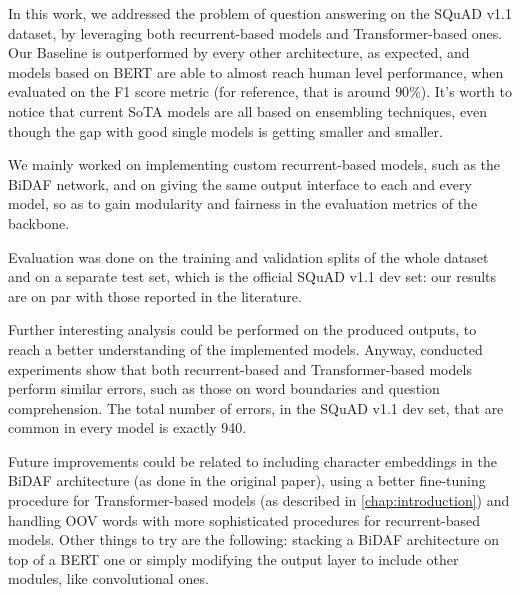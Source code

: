\documentclass[a4paper,10pt]{report}
\begin{document}
In this work, we addressed the problem of question answering on the SQuAD v1.1 dataset, by leveraging both recurrent-based models and Transformer-based ones. Our Baseline is outperformed by every other architecture, as expected, and models based on BERT are able to almost reach human level performance, when evaluated on the F1 score metric (for reference, that is around $90\%$). It's worth to notice that current SoTA models are all based on ensembling techniques, even though the gap with good single models is getting smaller and smaller.

We mainly worked on implementing custom recurrent-based models, such as the BiDAF network, and on giving the same output interface to each and every model, so as to gain modularity and fairness in the evaluation metrics of the backbone.

Evaluation was done on the training and validation splits of the whole dataset and on a separate test set, which is the official SQuAD v1.1 dev set: our results are on par with those reported in the literature.

Further interesting analysis could be performed on the produced outputs, to reach a better understanding of the implemented models. Anyway, conducted experiments show that both recurrent-based and Transformer-based models perform similar errors, such as those on word boundaries and question comprehension. The total number of errors, in the SQuAD v1.1 dev set, that are common in every model is exactly \num{940}.

Future improvements could be related to including character embeddings in the BiDAF architecture (as done in the original paper), using a better fine-tuning procedure for Transformer-based models (as described in \ref{chap:introduction}) and handling OOV words with more sophisticated procedures for recurrent-based models. Other things to try are the following: stacking a BiDAF architecture on top of a BERT one or simply modifying the output layer to include other modules, like convolutional ones.

\printbibliography
\end{document}
